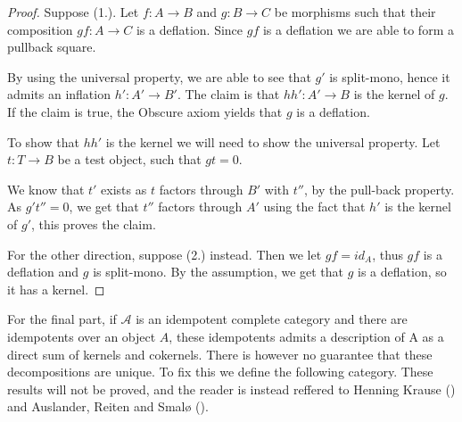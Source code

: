     \begin{proof}
        Suppose (1.). Let $f:A\rightarrow B$ and $g:B\rightarrow C$ be morphisms such that their composition $gf:A\rightarrow C$ is a deflation. Since $gf$ is a deflation we are able to form a pullback square.

        \begin{center}
        \end{center}

        By using the universal property, we are able to see that $g'$ is split-mono, hence it admits an inflation $h':A'\rightarrow B'$. The claim is that $hh':A'\rightarrow B$ is the kernel of $g$. If the claim is true, the Obscure axiom yields that $g$ is a deflation.

        To show that $hh'$ is the kernel we will need to show the universal property. Let $t:T\rightarrow B$ be a test object, such that $gt=0$.

        \begin{center}
        \end{center}

        We know that $t'$ exists as $t$ factors through $B'$ with $t''$, by the pull-back property. As $g't''=0$, we get that $t''$ factors through $A'$ using the fact that $h'$ is the kernel of $g'$, this proves the claim.
        
        For the other direction, suppose (2.) instead. Then we let $gf=id_A$, thus $gf$ is a deflation and $g$ is split-mono. By the assumption, we get that $g$ is a deflation, so it has a kernel.
    \end{proof}

    For the final part, if $\mathcal{A}$ is an idempotent complete category and there are idempotents over an object $A$, these idempotents admits a description of A as a direct sum of kernels and cokernels. There is however no guarantee that these decompositions are unique. To fix this we define the following category. These results will not be proved, and the reader is instead reffered to Henning Krause (\cite{Kra12}) and Auslander, Reiten and Smalø (\cite{Rei95}).

